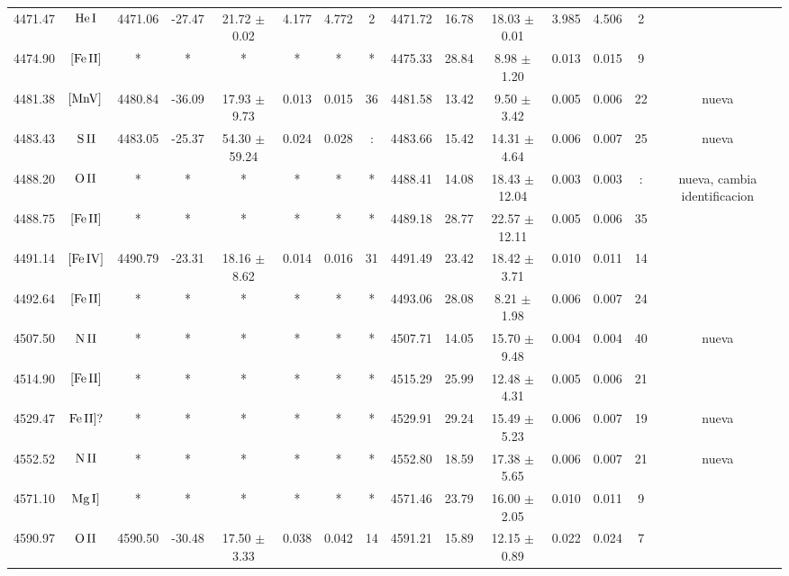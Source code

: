 \documentclass{article}
\begin{document}
\begin{table*}
\begin{adjustbox}{width=\textwidth}
\begin{tabular}{ccccccccccccccc}
4471.47 & $\mbox{He}\thinspace \mbox{I}$ & 4471.06 & -27.47 & 21.72 $\pm$ 0.02 & 4.177 & 4.772 & 2 & 4471.72 & 16.78 & 18.03 $\pm$ 0.01 & 3.985 & 4.506 & 2 &  \\
4474.90 & $\mbox{[Fe}\thinspace \mbox{II]}$ & * & * & * & * & * & * & 4475.33 & 28.84 & 8.98 $\pm$ 1.20 & 0.013 & 0.015 & 9 &  \\
4481.38 & $\mbox{[MnV]}\thinspace \mbox{}$ & 4480.84 & -36.09 & 17.93 $\pm$ 9.73 & 0.013 & 0.015 & 36 & 4481.58 & 13.42 & 9.50 $\pm$ 3.42 & 0.005 & 0.006 & 22 &  nueva \\
4483.43 & $\mbox{S}\thinspace \mbox{II}$ & 4483.05 & -25.37 & 54.30 $\pm$ 59.24 & 0.024 & 0.028 & : & 4483.66 & 15.42 & 14.31 $\pm$ 4.64 & 0.006 & 0.007 & 25 &  nueva \\
4488.20 & $\mbox{O}\thinspace \mbox{II}$ & * & * & * & * & * & * & 4488.41 & 14.08 & 18.43 $\pm$ 12.04 & 0.003 & 0.003 & : &  nueva, cambia identificacion \\
4488.75 & $\mbox{[Fe}\thinspace \mbox{II]}$ & * & * & * & * & * & * & 4489.18 & 28.77 & 22.57 $\pm$ 12.11 & 0.005 & 0.006 & 35 &  \\
4491.14 & $\mbox{[Fe}\thinspace \mbox{IV]}$ & 4490.79 & -23.31 & 18.16 $\pm$ 8.62 & 0.014 & 0.016 & 31 & 4491.49 & 23.42 & 18.42 $\pm$ 3.71 & 0.010 & 0.011 & 14 &  \\
4492.64 & $\mbox{[Fe}\thinspace \mbox{II]}$ & * & * & * & * & * & * & 4493.06 & 28.08 & 8.21 $\pm$ 1.98 & 0.006 & 0.007 & 24 &  \\
4507.50 & $\mbox{N}\thinspace \mbox{II}$ & * & * & * & * & * & * & 4507.71 & 14.05 & 15.70 $\pm$ 9.48 & 0.004 & 0.004 & 40 &  nueva \\
4514.90 & $\mbox{[Fe}\thinspace \mbox{II]}$ & * & * & * & * & * & * & 4515.29 & 25.99 & 12.48 $\pm$ 4.31 & 0.005 & 0.006 & 21 &  \\
4529.47 & $\mbox{Fe}\thinspace \mbox{II]?}$ & * & * & * & * & * & * & 4529.91 & 29.24 & 15.49 $\pm$ 5.23 & 0.006 & 0.007 & 19 &  nueva \\
4552.52 & $\mbox{N}\thinspace \mbox{II}$ & * & * & * & * & * & * & 4552.80 & 18.59 & 17.38 $\pm$ 5.65 & 0.006 & 0.007 & 21 &  nueva \\
4571.10 & $\mbox{Mg}\thinspace \mbox{I]}$ & * & * & * & * & * & * & 4571.46 & 23.79 & 16.00 $\pm$ 2.05 & 0.010 & 0.011 & 9 &  \\
4590.97 & $\mbox{O}\thinspace \mbox{II}$ & 4590.50 & -30.48 & 17.50 $\pm$ 3.33 & 0.038 & 0.042 & 14 & 4591.21 & 15.89 & 12.15 $\pm$ 0.89 & 0.022 & 0.024 & 7 &  \\

\end{tabular}
\end{adjustbox}
\end{table*}
\end{document}
